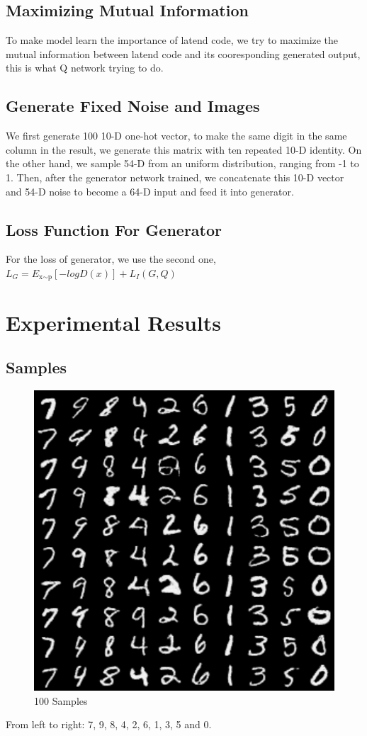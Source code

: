 \documentclass[12pt,a4paper]{article}
\begin{document}
\subsection{Maximizing Mutual Information}
To make model learn the importance of latend code, we try to maximize the mutual information between latend code and its cooresponding generated output, this is what Q network trying to do.
\subsection{Generate Fixed Noise and Images}
We first generate 100 10-D one-hot vector, to make the same digit in the same column in the result, we generate this matrix with ten repeated 10-D identity. On the other hand, we sample 54-D from an uniform distribution, ranging from -1 to 1. Then, after the generator network trained, we concatenate this 10-D vector and 54-D noise to become a 64-D input and feed it into generator.
\subsection{Loss Function For Generator}
For the loss of generator, we use the second one, $ L_G =  E_\text{x$\sim$p}[-logD(x)]+L_I(G, Q)$


\section{Experimental Results} \label{sec:res}
\subsection{Samples}
\begin{figure}[hbt]
\centering
\includegraphics[scale=0.5]{sample.png}
\caption{100 Samples}
\label{fig:samples}
\end{figure}
From left to right: 7, 9, 8, 4, 2, 6, 1, 3, 5 and 0.
\end{document}
